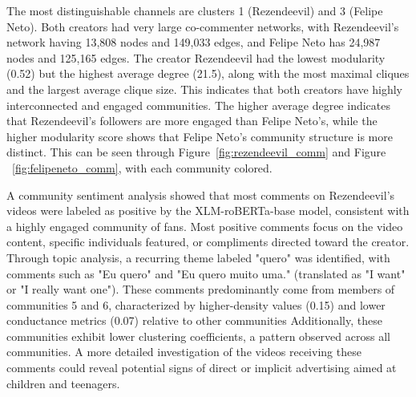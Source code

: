 \documentclass[sigconf]{acmart}
\begin{document}
The most distinguishable channels are clusters 1 (Rezendeevil) and 3 (Felipe Neto). 
Both creators had very large co-commenter networks, with Rezendeevil's network having 13,808 
nodes and 149,033 edges, and Felipe Neto has 24,987 nodes and 125,165 edges.
The creator Rezendeevil had the lowest modularity (0.52) but the highest average degree (21.5), 
along with the most maximal cliques and the largest average clique size.
This indicates that both creators have highly interconnected and engaged communities. The higher average
degree indicates that Rezendeevil's followers are more engaged than Felipe Neto's, while the higher
modularity score shows that Felipe Neto's community structure is more distinct.
This can be seen through Figure~\ref{fig:rezendeevil_comm} and Figure ~\ref{fig:felipeneto_comm}, 
with each community colored.

A community sentiment analysis showed that most comments on Rezendeevil's videos were labeled as 
positive by the XLM-roBERTa-base model, consistent with a highly engaged community of fans. Most positive comments focus on the video content, specific individuals featured, or compliments directed toward the creator. 
Through topic analysis, a recurring theme labeled 
"quero" was identified, with comments such as "Eu quero" and "Eu quero muito uma." 
(translated as "I want" or "I really want one").
These comments predominantly come from members of communities 5 and 6, characterized by higher-density 
values (0.15) and lower conductance metrics (0.07) relative to other communities
Additionally, these communities exhibit lower clustering coefficients, a pattern observed across all communities.
A more detailed investigation of the videos receiving these comments could reveal potential 
signs of direct or implicit advertising aimed at children and teenagers.
\end{document}
